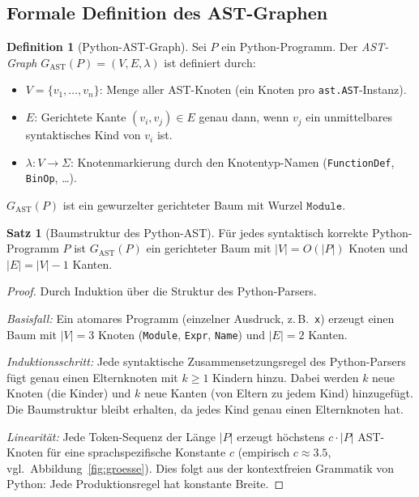 ﻿\documentclass[a4paper,12pt]{article}
\theoremstyle{definition}
\newtheorem{definition}{Definition}
\newtheorem{satz}{Satz}
\begin{document}
\subsection{Formale Definition des AST-Graphen}

\begin{definition}[Python-AST-Graph]
\label{def:astgraph}
Sei $P$ ein Python-Programm.  Der \emph{AST-Graph}
$G_{\mathrm{AST}}(P) = (V, E, \lambda)$ ist definiert durch:
\begin{itemize}
    \item $V = \{v_1, \ldots, v_n\}$: Menge aller AST-Knoten
          (ein Knoten pro \texttt{ast.AST}-Instanz).
    \item $E$: Gerichtete Kante $(v_i, v_j) \in E$ genau dann,
          wenn $v_j$ ein unmittelbares syntaktisches Kind von
          $v_i$ ist.
    \item $\lambda\colon V \to \Sigma$: Knotenmarkierung durch
          den Knotentyp-Namen (\texttt{FunctionDef},
          \texttt{BinOp}, \ldots).
\end{itemize}
$G_{\mathrm{AST}}(P)$ ist ein gewurzelter gerichteter Baum mit
Wurzel $\texttt{Module}$.
\end{definition}

\begin{satz}[Baumstruktur des Python-AST]
\label{satz:baum}
F\"ur jedes syntaktisch korrekte Python-Programm $P$ ist
$G_{\mathrm{AST}}(P)$ ein gerichteter Baum mit
$|V| = O(|P|)$ Knoten und $|E| = |V| - 1$ Kanten.
\end{satz}

\begin{proof}
Durch Induktion \"uber die Struktur des Python-Parsers.

\emph{Basisfall:} Ein atomares Programm (einzelner Ausdruck,
z.\,B.\ \texttt{x}) erzeugt einen Baum mit $|V| = 3$ Knoten
(\texttt{Module}, \texttt{Expr}, \texttt{Name}) und
$|E| = 2$ Kanten.

\emph{Induktionsschritt:} Jede syntaktische Zusammensetzungsregel
des Python-Parsers f\"ugt genau einen Elternknoten mit
$k \geq 1$ Kindern hinzu.  Dabei werden $k$ neue Knoten
(die Kinder) und $k$ neue Kanten (von Eltern zu jedem Kind)
hinzugef\"ugt.  Die Baumstruktur bleibt erhalten, da jedes
Kind genau einen Elternknoten hat.

\emph{Linearit\"at:} Jede Token-Sequenz der L\"ange $|P|$
erzeugt h\"ochstens $c \cdot |P|$ AST-Knoten f\"ur eine
sprachspezifische Konstante $c$ (empirisch $c \approx 3.5$,
vgl.\ Abbildung~\ref{fig:groesse}).  Dies folgt aus der
kontextfreien Grammatik von Python: Jede Produktionsregel
hat konstante Breite.
\end{proof}
\end{document}

